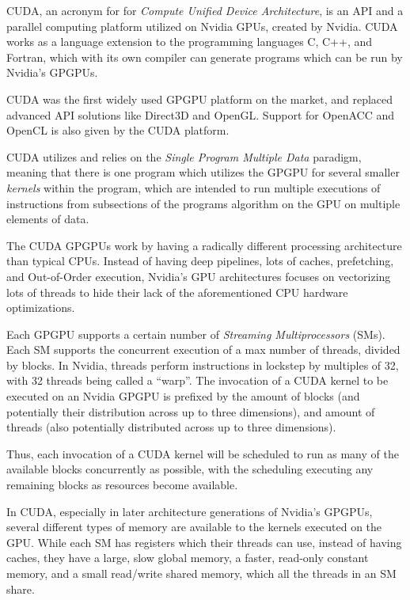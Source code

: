 CUDA, an acronym for for \textit{Compute Unified Device Architecture}, is an API and a parallel computing platform utilized on Nvidia GPUs, created by Nvidia.
CUDA works as a language extension to the programming languages C, C++, and Fortran, which with its own compiler can generate programs which can be run by Nvidia's GPGPUs.

CUDA was the first widely used GPGPU platform on the market, and replaced advanced API solutions like Direct3D and OpenGL.
Support for OpenACC and OpenCL is also given by the CUDA platform.

CUDA utilizes and relies on the \textit{Single Program Multiple Data} paradigm, meaning that there is one program which utilizes the GPGPU for several smaller \textit{kernels} within the program, which are intended to run multiple executions of instructions from subsections of the programs algorithm on the GPU on multiple elements of data.

The CUDA GPGPUs work by having a radically different processing architecture than typical CPUs.
Instead of having deep pipelines, lots of caches, prefetching, and Out-of-Order execution, Nvidia's GPU architectures focuses on vectorizing lots of threads to hide their lack of the aforementioned CPU hardware optimizations.

Each GPGPU supports a certain number of \textit{Streaming Multiprocessors} (SMs).
Each SM supports the concurrent execution of a max number of threads, divided by blocks. In Nvidia, threads perform instructions in lockstep by multiples of 32, with 32 threads being called a ``warp''.
The invocation of a CUDA kernel to be executed on an Nvidia GPGPU is prefixed by the amount of blocks (and potentially their distribution across up to three dimensions), and amount of threads (also potentially distributed across up to three dimensions).

Thus, each invocation of a CUDA kernel will be scheduled to run as many of the available blocks concurrently as possible, with the scheduling executing any remaining blocks as resources become available.

In CUDA, especially in later architecture generations of Nvidia's GPGPUs, several different types of memory are available to the kernels executed on the GPU.
While each SM has registers which their threads can use, instead of having caches, they have a large, slow global memory, a faster, read-only constant memory, and a small read/write shared memory, which all the threads in an SM share.

